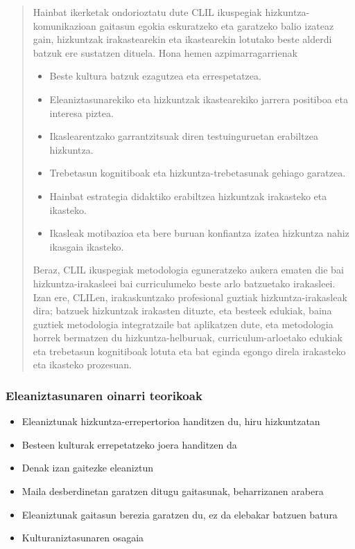 \documentclass[
]{book}
\providecommand{\tightlist}{%
  \setlength{\itemsep}{0pt}\setlength{\parskip}{0pt}}
\begin{document}
\begin{quote}
Hainbat ikerketak ondorioztatu dute CLIL ikuspegiak hizkuntza-komunikazioan gaitasun egokia eskuratzeko eta garatzeko balio izateaz gain, hizkuntzak irakastearekin eta ikastearekin lotutako beste alderdi batzuk ere sustatzen dituela. Hona hemen azpimarragarrienak

\begin{itemize}
\tightlist
\item
  Beste kultura batzuk ezagutzea eta errespetatzea.
\item
  Eleaniztasunarekiko eta hizkuntzak ikastearekiko jarrera positiboa eta interesa piztea.
\item
  Ikaslearentzako garrantzitsuak diren testuinguruetan erabiltzea hizkuntza.
\item
  Trebetasun kognitiboak eta hizkuntza-trebetasunak gehiago garatzea.
\item
  Hainbat estrategia didaktiko erabiltzea hizkuntzak irakasteko eta ikasteko.
\item
  Ikasleak motibazioa eta bere buruan konfiantza izatea hizkuntza nahiz ikasgaia ikasteko.
\end{itemize}

Beraz, CLIL ikuspegiak metodologia eguneratzeko aukera ematen die bai hizkuntza-irakasleei bai curriculumeko beste arlo batzuetako irakasleei. Izan ere, CLILen, irakaskuntzako profesional guztiak hizkuntza-irakasleak dira; batzuek hizkuntzak irakasten dituzte, eta besteek edukiak, baina guztiek metodologia integratzaile bat aplikatzen dute, eta metodologia horrek bermatzen du hizkuntza-helburuak, curriculum-arloetako edukiak eta trebetasun kognitiboak lotuta eta bat eginda egongo direla irakasteko eta ikasteko prozesuan.
\end{quote}

\hypertarget{eleaniztasunaren-oinarri-teorikoak}{%
\subsubsection{Eleaniztasunaren oinarri teorikoak}\label{eleaniztasunaren-oinarri-teorikoak}}

\begin{itemize}
\tightlist
\item
  Eleaniztunak hizkuntza-errepertorioa handitzen du, hiru hizkuntzatan
\item
  Besteen kulturak errepetatzeko joera handitzen da
\item
  Denak izan gaitezke eleaniztun
\item
  Maila desberdinetan garatzen ditugu gaitasunak, beharrizanen arabera
\item
  Eleaniztunak gaitasun berezia garatzen du, ez da elebakar batzuen batura
\item
  Kulturaniztasunaren osagaia
\end{itemize}
\end{document}
